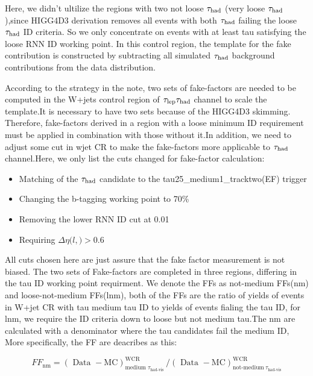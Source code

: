 Here, we didn't ultilize the regions with two not loose $\tau_\text{had}$ (very loose $\tau_\text{had}$ ),since HIGG4D3 derivation removes all events with both $\tau_\text{had}$ failing the loose $\tau_\text{had}$ ID criteria. So we only concentrate on events with at least tau satisfying the loose RNN ID working point. In this control region, the template for the fake contribution is constructed by subtracting all simulated $\tau_\text{had}$ background contributions from the data distribution.

According to the strategy in the note, two sets of fake-factors are needed to be computed in the W+jets control region of $\tau_\text{lep}{}\tau_\text{had}$ channel to scale the template.It is necessary to have two sets because of the HIGG4D3 skimming. Therefore, fake-factors derived in a region with a loose minimum ID requirement must be applied in combination with those without it.In addition, we need to adjust some cut in wjet CR to make the fake-factors more applicable to $\tau_\text{had}$ channel.Here, we only list the cuts changed for fake-factor calculation:

\begin{itemize}
\item    Matching of the $\tau_\text{had}$ candidate to the tau25\_medium1\_tracktwo(EF) trigger

\item    Changing the b-tagging working point to 70\%

\item    Removing the lower RNN ID cut at 0.01

\item    Requiring $\Delta\eta (l,$\tauhad$)>0.6$
\end{itemize}

All cuts chosen here are just assure that the fake factor measurement is not biased. The two sets of Fake-factors are completed in three regions, differing in the tau ID working point requirment. We denote the FFs as not-medium FFs(nm) and loose-not-medium FFs(lnm), both of the FFs are the ratio of yields of events in W+jet CR with tau medium tau ID to yields of events fialing the tau ID, for lnm, we require the ID criteria down to loose but not medium tau.The nm are calculated with a denominator where the tau candidates fail the medium ID, More specifically, the FF are deacribes as this: 

\begin{equation}
F F_{\mathrm{nm}}=(\text { Data }-\mathrm{MC})_{\text {medium } \tau_{\text {had-vis }}}^{\mathrm{WCR}} /(\text { Data }-\mathrm{MC})_{\text {not-medium}\ \tau_{\text{had-vis}}}^{\mathrm{WCR}} 
\end{equation}

